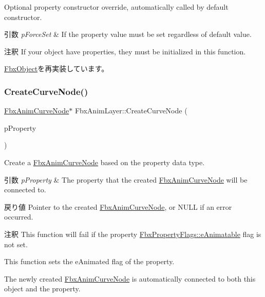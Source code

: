 Optional property constructor override, automatically called by default constructor. 
\begin{DoxyParams}{引数}
{\em p\+Force\+Set} & If the property value must be set regardless of default value. \\
\hline
\end{DoxyParams}
\begin{DoxyRemark}{注釈}
If your object have properties, they must be initialized in this function. 
\end{DoxyRemark}


\hyperlink{class_fbx_object_ad44f814323dc1b5e78bff1bfc608b4bb}{Fbx\+Object}を再実装しています。

\mbox{\label{class_fbx_anim_layer_a634a9dd8c4a0a7457a15d50f9643d4e0}} 
\subsubsection{\texorpdfstring{Create\+Curve\+Node()}{CreateCurveNode()}}
{\footnotesize\ttfamily \hyperlink{class_fbx_anim_curve_node}{Fbx\+Anim\+Curve\+Node}$\ast$ Fbx\+Anim\+Layer\+::\+Create\+Curve\+Node (\begin{DoxyParamCaption}\item[{\hyperlink{class_fbx_property}{Fbx\+Property} \&}]{p\+Property }\end{DoxyParamCaption})}

Create a \hyperlink{class_fbx_anim_curve_node}{Fbx\+Anim\+Curve\+Node} based on the property data type. 
\begin{DoxyParams}{引数}
{\em p\+Property} & The property that the created \hyperlink{class_fbx_anim_curve_node}{Fbx\+Anim\+Curve\+Node} will be connected to. \\
\hline
\end{DoxyParams}
\begin{DoxyReturn}{戻り値}
Pointer to the created \hyperlink{class_fbx_anim_curve_node}{Fbx\+Anim\+Curve\+Node}, or N\+U\+LL if an error occurred. 
\end{DoxyReturn}
\begin{DoxyRemark}{注釈}
This function will fail if the property \hyperlink{class_fbx_property_flags_afabfa7e0949aac8a7dcdf8a141867e99ae2c562a65bb942f3f94631794bc3d257}{Fbx\+Property\+Flags\+::e\+Animatable} flag is not set. 

This function sets the e\+Animated flag of the property. 

The newly created \hyperlink{class_fbx_anim_curve_node}{Fbx\+Anim\+Curve\+Node} is automatically connected to both this object and the property. 
\end{DoxyRemark}
\mbox{\label{class_fbx_anim_layer_ab031a979290c44d59ae3ba25a4ab2169}} 

